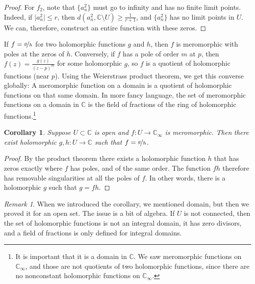 \documentclass[12pt,openany]{book}
\newcommand{\sabs}[1]{\lvert {#1} \rvert}
\newcommand{\C}{{\mathbb{C}}}
\theoremstyle{plain}
\newtheorem{cor}[thm]{Corollary}
\theoremstyle{remark}
\newtheorem{remark}[thm]{Remark}
\theoremstyle{definition}
\theoremstyle{exercise}
\theoremstyle{example}
\begin{document}
\begin{proof}
For $f_2$, note that $\{a^2_n\}$ must go to infinity and has no finite limit
points.  Indeed, if $\sabs{a^2_n} \leq r$, then $d(a^2_n,\C\setminus U)
\geq \frac{1}{r+1}$, and $\{ a^2_n \}$ has no limit points in
$U$.
We can, therefore, construct an entire function with
these zeros.
\end{proof}

If $f = \nicefrac{g}{h}$ for two holomorphic functions $g$ and $h$, then $f$
is meromorphic with poles at the zeros of $h$.  Conversely,
if $f$ has a pole of order $m$ at $p$, then $f(z) = \frac{g(z)}{{(z-p)}^m}$
for some holomorphic $g$, so $f$ is a quotient of holomorphic functions
(near $p$).
Using the Weierstrass product theorem, we get this converse globally:
A meromorphic function on a domain is a quotient of holomorphic functions on
that same domain.
In more fancy language, the set of meromorphic functions on a
domain in $\C$ is the field of fractions of the ring of holomorphic
functions.\footnote{It is important that it is a
domain in $\C$.  We saw meromorphic functions on $\C_\infty$,
and those are not quotients of two holomorphic functions, since there are
no nonconstant holomorphic functions on $\C_\infty$.}

\begin{cor}
Suppose $U \subset \C$ is open and $f \colon U \to \C_{\infty}$ is
meromorphic.  Then there exist holomorphic $g,h \colon U \to \C$ such that
$f = \nicefrac{g}{h}$.
\end{cor}

\begin{proof}
By the product theorem there exists a holomorphic function $h$ that has
zeros exactly where $f$ has poles, and of the same order.  The function $fh$
therefore has removable singularities at all the poles of $f$.  In other
words, there is a holomorphic $g$ such that $g=fh$.
\end{proof}

\begin{remark}
When we introduced the corollary, we mentioned domain, but then we proved it
for an open set.  The issue is a bit of algebra.  If $U$ is not connected,
then the set of holomorphic functions is not an integral domain, it has zero
divisors, and a field of fractions is only defined for integral domains.
\end{remark}
\end{document}

